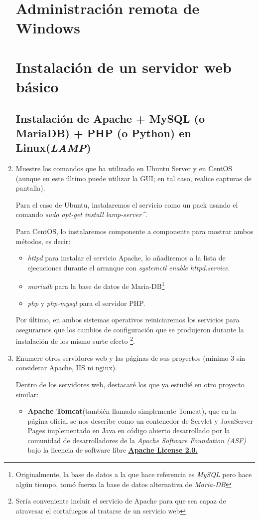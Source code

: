 \documentclass[paper=a4, fontsize=11pt]{scrartcl} %
\numberwithin{equation}{section} %
\numberwithin{figure}{section} %
\numberwithin{table}{section} %
\begin{document}
\begin{enumerate}
	\section{Administración remota de Windows}
	\section{Instalación de un servidor web básico}
	\subsection{Instalación de Apache + MySQL (o MariaDB) + PHP (o Python) en Linux(\textit{LAMP})}
		\item Muestre los comandos que ha utilizado en Ubuntu Server y en CentOS (aunque en este último
		puede utilizar la GUI; en tal caso, realice capturas de pantalla).
		
		Para el caso de Ubuntu, instalaremos el servicio como un pack usando el comando \textit{sudo
		apt-get install lamp-server\^}.
		
		Para CentOS, lo instalaremos componente a componente para mostrar ambos métodos, es decir:
		\begin{itemize}
			\item \textit{httpd} para instalar el servicio Apache, lo añadiremos a la lista de
			ejecuciones durante el arranque con \textit{systemctl enable httpd.service}.
			
			\item \textit{mariadb} para la base de datos de Maria-DB\footnote{Originalmente, la base
			de datos a la que hace referencia es \textit{MySQL} pero hace algún tiempo, tomó fuerza la
			base de datos alternativa de \textit{Maria-DB}}
			
			\item \textit{php} y \textit{php-mysql} para el servidor PHP.
		\end{itemize}
		
		Por último, en ambos sistemas operativos reiniciaremos los servicios para asegurarnos que los
		cambios de configuración que se produjeron durante la instalación de los mismo surte efecto
		\footnote{Sería conveniente incluir el servicio de Apache para que sea capaz de atravesar el
		cortafuegos al tratarse de un servicio web}.
		
		\item Enumere otros servidores web y las páginas de sus proyectos (mínimo 3 sin considerar
		Apache, IIS ni nginx).
		
		Dentro de los servidores web, destacaré los que ya estudié en otro proyecto similar\cite{TWG}:
		\begin{itemize}
			\item \textbf{Apache Tomcat}\cite{TC_official}(también llamado simplemente Tomcat), que
			en la página oficial se nos describe como un contenedor de Servlet y JavaServer Pages
			implementado en Java en código abierto desarrollado por la comunidad de desarrolladores
			de la \textit{Apache Software Foundation (ASF)} bajo la licencia de software libre
			\href{https://www.apache.org/licenses/LICENSE-2.0.html}{\textbf{Apache License 2.0.}}
			

\end{itemize}
\end{enumerate}
\end{document}
